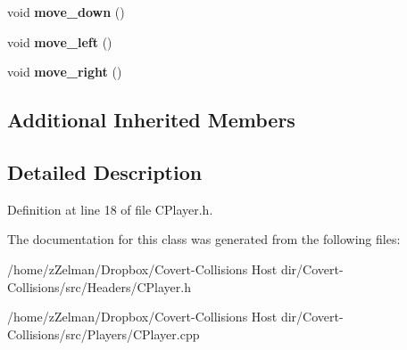 \begin{DoxyCompactItemize}
\item 
\hypertarget{classCPlayer_aaa672441a4b0b4544590492ddaf67e86}{void {\bfseries move\-\_\-down} ()}\label{classCPlayer_aaa672441a4b0b4544590492ddaf67e86}

\item 
\hypertarget{classCPlayer_acb93d455528a966b13f74371db2d60bc}{void {\bfseries move\-\_\-left} ()}\label{classCPlayer_acb93d455528a966b13f74371db2d60bc}

\item 
\hypertarget{classCPlayer_abdada73af7a83664c078260bc091a4ea}{void {\bfseries move\-\_\-right} ()}\label{classCPlayer_abdada73af7a83664c078260bc091a4ea}

\end{DoxyCompactItemize}
\subsection*{Additional Inherited Members}


\subsection{Detailed Description}


Definition at line 18 of file C\-Player.\-h.



The documentation for this class was generated from the following files\-:\begin{DoxyCompactItemize}
\item 
/home/z\-Zelman/\-Dropbox/\-Covert-\/\-Collisions Host dir/\-Covert-\/\-Collisions/src/\-Headers/C\-Player.\-h\item 
/home/z\-Zelman/\-Dropbox/\-Covert-\/\-Collisions Host dir/\-Covert-\/\-Collisions/src/\-Players/C\-Player.\-cpp\end{DoxyCompactItemize}
